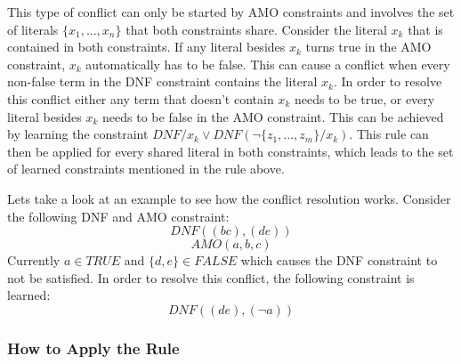 This type of conflict can only be started by AMO constraints and involves the set of literals $\{x_1,...,x_n\}$ that both constraints share. Consider the literal $x_k$ that is contained in both constraints. If any literal besides $x_k$ turns true in the AMO constraint, $x_k$ automatically has to be false. This can cause a conflict when every non-false term in the DNF constraint contains the literal $x_k$. In order to resolve this conflict either any term that doesn't contain $x_k$ needs to be true, or every literal besides $x_k$ needs to be false in the AMO constraint. This can be achieved by learning the constraint $DNF / x_k \vee DNF(\neg \{z_1,...,z_m\}/x_k)$. This rule can then be applied for every shared literal in both constraints, which leads to the set of learned constraints mentioned in the rule above.

Lets take a look at an example to see how the conflict resolution works. Consider the following DNF and AMO constraint:
\begin{displaymath}
DNF((bc),(de))
\end{displaymath}
\begin{displaymath}
AMO(a,b,c)
\end{displaymath}
Currently $a \in TRUE$ and $\{d,e\} \in FALSE$ which causes the DNF constraint to not be satisfied. In order to resolve this conflict, the following constraint is learned:
\begin{displaymath}
DNF((de),(\neg a))
\end{displaymath}

\subsubsection{How to Apply the Rule}

